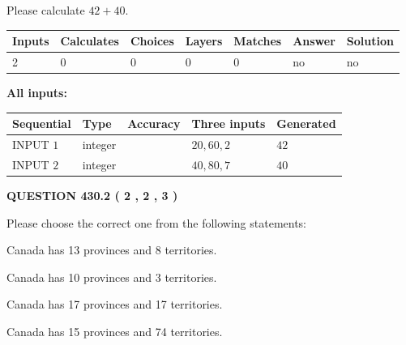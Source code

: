 \documentclass[12pt]{article}
\begin{document}
  
 
Please calculate $ %
42 +  %
40 $.
 
 
   
   
   
   
\noindent\begin{tabular}{|l|l|l|l|l|l|l|}
 \hline
Inputs & Calculates & Choices & Layers & Matches & Answer & Solution \\ \hline
 2  & 
 0  & 
 0
  & 
 0  & 
 0  & 
  no & 
  no 
  \\ \hline
 \end{tabular}
   
   
   
   
\noindent{}
   
   
   
   
\noindent\vspace{0.1in}\hspace{-0.08in} {\textbf{\Large{All inputs: }}}
   
   
  
  
\noindent\begin{tabular}{|l|l|l|l|l|}
\hline
 Sequential & Type & Accuracy & Three inputs & Generated \\ 
\hline
 
 
  INPUT $  1 $ & integer &  & $
 20
 , 
 60
 , 
 2
 $ & $ 42 $ 
 \\  \hline  
 
 
  INPUT $  2 $ & integer &  & $
 40
 , 
 80
 , 
 7
 $ & $ 40 $ 
 \\  \hline  
 \end{tabular}
   
   
  
\vspace{0.2in}
  
{\textbf{\Large{QUESTION
430.2 
 ( 2 , 2 , 3 )
}}}
  
  
Please choose the correct one from the following statements:
 
 
Canada has  13 provinces and  8 territories.
 
 
Canada has 10  provinces and 3 territories.
 
 
Canada has  17 provinces and  17 territories.
 
 
Canada has  15 provinces and  74 territories.
 
\end{document}
